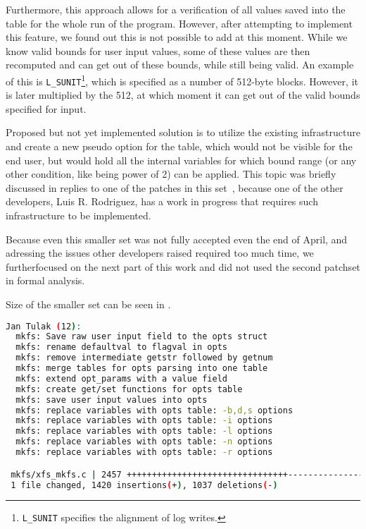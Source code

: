 Furthermore, this approach allows for a verification of all values saved into
the table for the whole run of the program. However, after attempting to
implement this feature, we found out this is not possible to add at this moment.
While we know valid bounds for user input values, some of these values are then
recomputed and can get out of these bounds, while still being valid. An example
of this is {\tt L\_SUNIT}\footnote{{\tt L\_SUNIT} specifies the alignment of
log writes.}, which is specified as a number of 512-byte blocks. However, it is
later multiplied by the 512, at which moment it can get out of the valid bounds
specified for input.

Proposed but not yet implemented solution is to utilize the existing
infrastructure and create a new pseudo option for the table, which would not be
visible for the end user, but would hold all the internal variables for which
bound range (or any other condition, like being power of 2) can be applied.
This topic was briefly discussed in replies to one of the patches in this
set~\cite{secondSetSplitOtherVars}, because one of the other developers, Luis
R. Rodriguez, has a work in progress that requires such infrastructure to be
implemented.

Because even this smaller set was not fully accepted even the end of April,
and adressing the issues other developers raised required too much time, we
furtherfocused on the next part of
this work and did not used the second patchset in formal analysis.

Size of the smaller set can be seen in
.
\begin{lstlisting}[frame=none, basicstyle=\footnotesize\ttfamily,
language=Bash, numbers=none, numberstyle=\tiny\color{black},caption= {Git
statistics for the first part of the second set after its breaking into
smaller parts~\cite{secondSetSplitFirst}.},
label={lst:refactoring:firstSmallerGit}]
Jan Tulak (12):
  mkfs: Save raw user input field to the opts struct
  mkfs: rename defaultval to flagval in opts
  mkfs: remove intermediate getstr followed by getnum
  mkfs: merge tables for opts parsing into one table
  mkfs: extend opt_params with a value field
  mkfs: create get/set functions for opts table
  mkfs: save user input values into opts
  mkfs: replace variables with opts table: -b,d,s options
  mkfs: replace variables with opts table: -i options
  mkfs: replace variables with opts table: -l options
  mkfs: replace variables with opts table: -n options
  mkfs: replace variables with opts table: -r options

 mkfs/xfs_mkfs.c | 2457 ++++++++++++++++++++++++++++++++-----------------------
 1 file changed, 1420 insertions(+), 1037 deletions(-)
\end{lstlisting}


